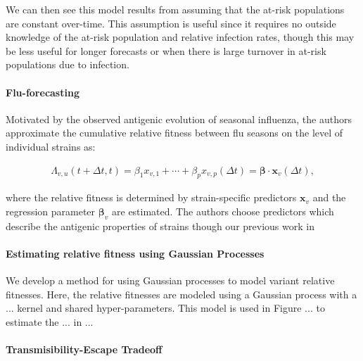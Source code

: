 \documentclass[12pt,oneside,letterpaper]{article}
\renewcommand{\vec}[1]{\boldsymbol{#1}}
\begin{document}
We can then see this model results from assuming that the at-risk populations are constant over-time.
This assumption is useful since it requires no outside knowledge of the at-risk population and relative infection rates, though this may be less useful for longer forecasts or when there is large turnover in at-risk populations due to infection.

\paragraph{Flu-forecasting}%

Motivated by the observed antigenic evolution of seasonal influenza, the authors approximate the cumulative relative fitness between flu seasons on the level of individual strains as:

\begin{align*}
    \Lambda_{v,u}(t + \Delta t,t) = \beta_{1} x_{v,1} + \cdots + \beta_{p} x_{v, p} (\Delta t) = \vec{\beta} \cdot \vec{x}_{v} (\Delta t),
\end{align*}

where the relative fitness is determined by strain-specific predictors $\vec{x}_{v}$ and the regression parameter $\vec{\beta}_{v}$ are estimated.
The authors choose predictors which describe the antigenic properties of strains though our previous work in 

\paragraph{Estimating relative fitness using Gaussian Processes}%

We develop a method for using Gaussian processes to model variant relative fitnesses.
Here, the relative fitnesses are modeled using a Gaussian process with a ... kernel and shared hyper-parameters.
This model is used in Figure ... to estimate the ... in ...

\paragraph{Transmisibility-Escape Tradeoff}%
\end{document}
